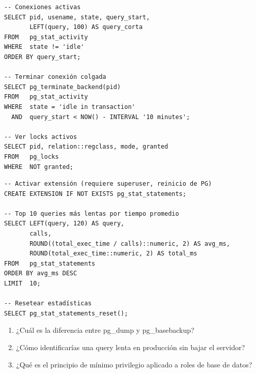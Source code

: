 \begin{lstlisting}[caption={Monitoreo --- conexiones, locks y queries lentas}]
-- Conexiones activas
SELECT pid, usename, state, query_start,
       LEFT(query, 100) AS query_corta
FROM   pg_stat_activity
WHERE  state != 'idle'
ORDER BY query_start;

-- Terminar conexión colgada
SELECT pg_terminate_backend(pid)
FROM   pg_stat_activity
WHERE  state = 'idle in transaction'
  AND  query_start < NOW() - INTERVAL '10 minutes';

-- Ver locks activos
SELECT pid, relation::regclass, mode, granted
FROM   pg_locks
WHERE  NOT granted;
\end{lstlisting}

\begin{lstlisting}[caption={pg\_stat\_statements --- queries más lentas}]
-- Activar extensión (requiere superuser, reinicio de PG)
CREATE EXTENSION IF NOT EXISTS pg_stat_statements;

-- Top 10 queries más lentas por tiempo promedio
SELECT LEFT(query, 120) AS query,
       calls,
       ROUND((total_exec_time / calls)::numeric, 2) AS avg_ms,
       ROUND(total_exec_time::numeric, 2) AS total_ms
FROM   pg_stat_statements
ORDER BY avg_ms DESC
LIMIT  10;

-- Resetear estadísticas
SELECT pg_stat_statements_reset();
\end{lstlisting}

\begin{entrevistabox}
\begin{enumerate}
  \item ¿Cuál es la diferencia entre pg\_dump y pg\_basebackup?
  \item ¿Cómo identificarías una query lenta en producción sin bajar el servidor?
  \item ¿Qué es el principio de mínimo privilegio aplicado a roles de base de datos?
\end{enumerate}
\end{entrevistabox}

